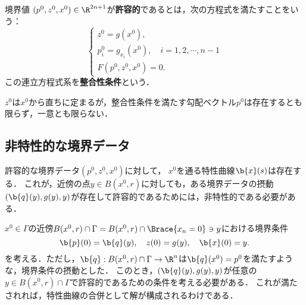 \documentclass[uplatex,dvipdfmx]{jsreport}
\begin{document}
\begin{definition}
    境界値
    $(p^0,z^0,x^0)\in\R^{2n+1}$が\textbf{許容的}であるとは，次の方程式を満たすことをいう：
    \[\begin{cases}
        z^0=g(x^0),\\
        p^0_i=g_{x_i}(x^0),\quad i=1,2,\cdots,n-1\\
        F(p^0,z^0,x^0)=0.
    \end{cases}\]
    この連立方程式系を\textbf{整合性条件}という．
\end{definition}
\begin{remark}
    $z^0$は$x^0$から直ちに定まるが，整合性条件を満たす勾配ベクトル$p^0$は存在するとも限らず，一意とも限らない．
\end{remark}

\subsection{非特性的な境界データ}

\begin{tcolorbox}[colframe=ForestGreen, colback=ForestGreen!10!white,breakable,colbacktitle=ForestGreen!40!white,coltitle=black,fonttitle=\bfseries\sffamily,
title=]
    許容的な境界データ$(p^0,z^0,x^0)$に対して，
    $x^0$を通る特性曲線$\b{x}(s)$は存在する．
    これが，近傍の点$y\in B(x^0,r)$に対しても，ある境界データの摂動
    $(\b{q}(y),g(y),y)$が存在して許容的であるためには，非特性的である必要がある．
\end{tcolorbox}

\begin{observation}[問題の所在]
    $x^0\in\Gamma$の近傍$B(x^0,r)\cap\Gamma=B(x^0,r)\cap\Brace{x_n=0}\ni y$における境界条件
    \[\b{p}(0)=\b{q}(y),\quad z(0)=g(y),\quad \b{x}(0)=y.\]
    を考える．ただし，$\b{q}:B(x^0,r)\cap\Gamma\to\R^n$は$\b{q}(x^0)=p^0$を満たすような，境界条件の摂動とした．
    このとき，$(\b{q}(y),g(y),y)$が任意の$y\in B(x^0,r)\cap\Gamma$で許容的であるための条件を考える必要がある．
    これが満たされれば，特性曲線の合併として解が構成されるわけである．
\end{observation}
\end{document}
